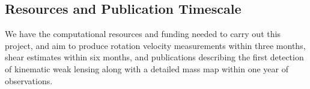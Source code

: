 \documentclass[12pt]{article}
\begin{document}
\subsection{Resources and Publication Timescale}
We have the computational resources and funding needed to carry out this project, and aim to produce rotation velocity measurements within three months, shear estimates within six months, and publications describing the first detection of kinematic weak lensing along with a detailed mass map within one year of observations.
\end{document}
